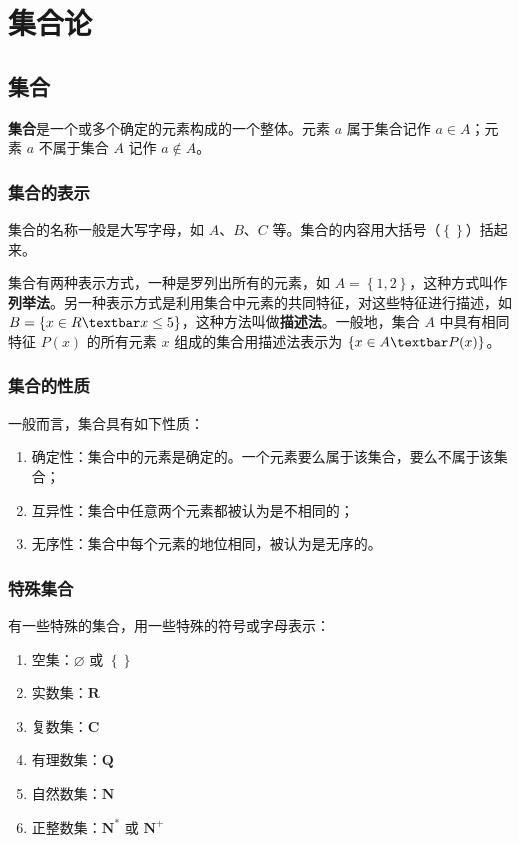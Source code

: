 \chapter{集合论}

\section{集合}

\textbf{集合}是一个或多个确定的元素构成的一个整体。元素 $a$ 属于集合记作 $a \in A$；元素 $a$ 不属于集合 $A$ 记作 $a \notin A$。

\subsection{集合的表示}

集合的名称一般是大写字母，如 $A$、$B$、$C$ 等。集合的内容用大括号（$\left\{\right\}$）括起来。

集合有两种表示方式，一种是罗列出所有的元素，如 $A=\left\{1, 2\right\}$，这种方式叫作\textbf{列举法}。另一种表示方式是利用集合中元素的共同特征，对这些特征进行描述，如 $B=\left\{x \in R \textbar x \leq 5\right\}$，这种方法叫做\textbf{描述法}。一般地，集合 $A$ 中具有相同特征 $P(x)$ 的所有元素 $x$ 组成的集合用描述法表示为 $\left\{x \in A \textbar P(x)\right\}$。

\subsection{集合的性质}

一般而言，集合具有如下性质：

\begin{enumerate}
\item 确定性：集合中的元素是确定的。一个元素要么属于该集合，要么不属于该集合；
\item 互异性：集合中任意两个元素都被认为是不相同的；
\item 无序性：集合中每个元素的地位相同，被认为是无序的。
\end{enumerate}

\subsection{特殊集合}

有一些特殊的集合，用一些特殊的符号或字母表示：

\begin{enumerate}
\item 空集：$\varnothing$ 或 $\left\{\right\}$
\item 实数集：$\mathbf{R}$
\item 复数集：$\mathbf{C}$
\item 有理数集：$\mathbf{Q}$
\item 自然数集：$\mathbf{N}$
\item 正整数集：$\mathbf{N}^*$ 或 $\mathbf{N}^+$
\end{enumerate}

